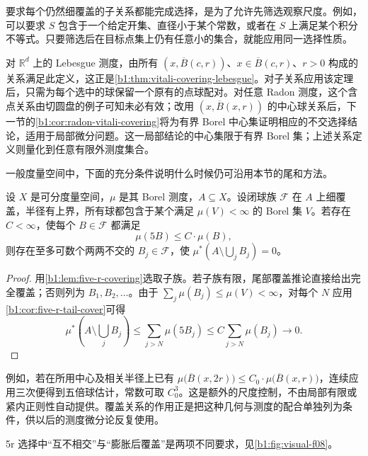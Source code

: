 要求每个仍然细覆盖的子关系都能完成选择，是为了允许先筛选观察尺度。例如，可以要求 \(S\) 包含于一个给定开集、直径小于某个常数，或者在 \(S\) 上满足某个积分不等式。只要筛选后在目标点集上仍有任意小的集合，就能应用同一选择性质。

\ProseParagraphBreak

对 \(\mathbb R^d\) 上的 Lebesgue 测度，由所有 \((x,\overline B(c,r))\)、\(x\in\overline B(c,r)\)、\(r>0\) 构成的关系满足此定义，这正是\cref{b1:thm:vitali-covering-lebesgue}。对子关系应用该定理后，只需为每个选中的球保留一个原有的点球配对。对任意 Radon 测度，这个含点关系由切圆盘的例子可知未必有效；改用 \((x,\overline B(x,r))\) 的中心球关系后，下一节的\cref{b1:cor:radon-vitali-covering}将为有界 Borel 中心集证明相应的不交选择结论，适用于局部微分问题。这一局部结论的中心集限于有界 Borel 集；上述关系定义则量化到任意有限外测度集合。

\ProseParagraphBreak

一般度量空间中，下面的充分条件说明什么时候仍可沿用本节的尾和方法。

\begin{proposition}
\label{b1:prop:controlled-dilation-vitali}
设 \(X\) 是可分度量空间，\(\mu\) 是其 Borel 测度，\(A\subseteq X\)。设闭球族 \(\mathcal F\) 在 \(A\) 上细覆盖，半径有上界，所有球都包含于某个满足 \(\mu(V)<\infty\) 的 Borel 集 \(V\)。若存在 \(C<\infty\)，使每个 \(B\in\mathcal F\) 都满足
\[
\mu(5B)\leq C\cdot\mu(B),
\]
则存在至多可数个两两不交的 \(B_j\in\mathcal F\)，使 \(\mu^*(A\setminus\bigcup_jB_j)=0\)。
\end{proposition}
\begin{proof}
用\cref{b1:lem:five-r-covering}选取子族。若子族有限，尾部覆盖推论直接给出完全覆盖；否则列为 \(B_1,B_2,\ldots\)。由于 \(\sum_j\mu(B_j)\leq\mu(V)<\infty\)，对每个 \(N\) 应用\cref{b1:cor:five-r-tail-cover}可得
\[
\mu^*\left(A\setminus\bigcup_jB_j\right)
\leq\sum_{j>N}\mu(5B_j)
\leq C\sum_{j>N}\mu(B_j)
\longrightarrow0.
\]
\end{proof}

例如，若在所用中心及相关半径上已有 \(\mu\bigl(\overline B(x,2r)\bigr)\leq C_0\cdot\mu\bigl(\overline B(x,r)\bigr)\)，连续应用三次便得到五倍球估计，常数可取 \(C_0^3\)。这是额外的尺度控制，不由局部有限或紧内正则性自动提供。覆盖关系的作用正是把这种几何与测度的配合单独列为条件，供以后的测度微分论反复使用。

5r 选择中“互不相交”与“膨胀后覆盖”是两项不同要求，见\cref{b1:fig:visual-f08}。

